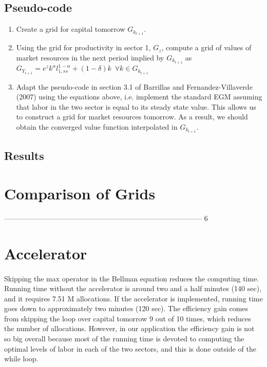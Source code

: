 \documentclass[11pt,a4paper]{article}
\begin{document}
\subsection*{Pseudo-code}
\begin{enumerate}
\item Create a grid for capital tomorrow $G_{k_{t+1}}$.
\item Using the grid for productivity in sector 1, $G_z$, compute a grid of values of market resources in the next period implied by $G_{k_{t+1}}$ as $G_{Y_{t+1}} = e^z k^{\alpha} l_{1,ss}^{1-\alpha} + (1-\delta) k \:\; \forall k \in G_{k_{t+1}}$
\item Adapt the pseudo-code in section 3.1 of Barrillas and Fernandez-Villaverde (2007) using the equations above, i.e. implement the standard EGM assuming that labor in the two sector is equal to its steady state value. This allows us to construct a grid for market resources tomorrow. As a result, we should obtain the converged value function interpolated in $G_{k_{t+1}}$.
\end{enumerate}


\subsection*{Results}


\section{Comparison of Grids}

-----------------------------------------------------------------------------------
6

\section{Accelerator}
\paragraph{} Skipping the max operator in the Bellman equation reduces the computing time. Running time without the accelerator is around two and a half minutes (140 sec), and it requires 7.51 M allocations. If the accelerator is implemented, running time goes down to approximately two minutes (120 sec). The efficiency gain comes from skipping the loop over capital tomorrow 9 out of 10 times, which reduces the number of allocations. However, in our application the efficiency gain is not so big overall because most of the running time is devoted to computing the optimal levels of labor in each of the two sectors, and this is done outside of the while loop.
\end{document}
